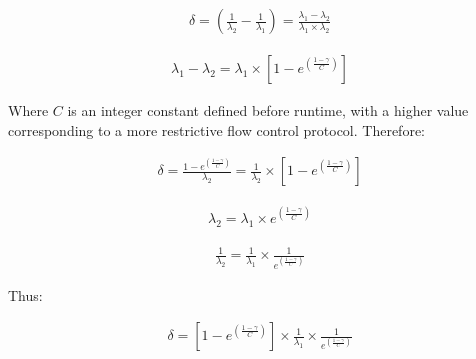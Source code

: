     \begin{equation}
		     \begin{aligned}
		         \delta = (\frac{1}{\lambda_2} - \frac{1}{\lambda_1}) = \frac{\lambda_1 - \lambda_2}{\lambda_1 \times \lambda_2}
		     \end{aligned}
    \end{equation} 
        
    \begin{equation}
		     \begin{aligned}
		         \lambda_1 - \lambda_2 = \lambda_1 \times [1 - e ^{ ({\frac{1-\gamma}{C}})}]
		     \end{aligned}
    \end{equation} 
    
    Where $C$ is an integer constant defined before runtime, with a higher value corresponding to a more restrictive flow control protocol.  
    Therefore:
    
    \begin{equation}
		     \begin{aligned}
		         \delta = \frac{1 - e ^{ ({\frac{1-\gamma}{C}})}}{\lambda_2} = \frac{1}{\lambda_2} \times [1 - e ^{ ({\frac{1-\gamma}{C}})}]
		     \end{aligned}
    \end{equation}
    
    \begin{equation}
		     \begin{aligned}
		         \lambda_2 = \lambda_1 \times e ^{ ({\frac{1-\gamma}{C}})}
		     \end{aligned}
    \end{equation}     
    
    \begin{equation}
		     \begin{aligned}
		         \frac{1}{\lambda_2} = \frac{1}{\lambda_1} \times \frac{1}{e ^{ ({\frac{1-\gamma}{C}})}}
		     \end{aligned}
    \end{equation}
    
    Thus:
    
     \begin{equation}
		     \begin{aligned}
		         \delta = [1 - e ^{ ({\frac{1-\gamma}{C}})}] \times \frac{1}{\lambda_1} \times \frac{1}{e ^{ ({\frac{1-\gamma}{C}})}}
		     \end{aligned}
    \end{equation}
    
